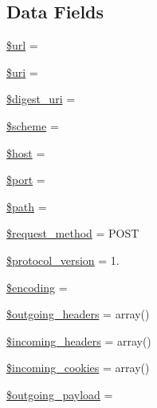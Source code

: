 \subsection*{Data Fields}
\begin{DoxyCompactItemize}
\item 
\hyperlink{classsoap__transport__http_acf215f34a917d014776ce684a9ee8909}{\$url} = \textquotesingle{}\textquotesingle{}
\item 
\hyperlink{classsoap__transport__http_a653b5458163d338546c47271b4fb81b7}{\$uri} = \textquotesingle{}\textquotesingle{}
\item 
\hyperlink{classsoap__transport__http_a7852708352a061a957ebd0fe6f4b0597}{\$digest\+\_\+uri} = \textquotesingle{}\textquotesingle{}
\item 
\hyperlink{classsoap__transport__http_a1665950e3e3b63a02fc5a48706ac81c4}{\$scheme} = \textquotesingle{}\textquotesingle{}
\item 
\hyperlink{classsoap__transport__http_a711797613cb863ca0756df789c396bf2}{\$host} = \textquotesingle{}\textquotesingle{}
\item 
\hyperlink{classsoap__transport__http_aa0787efab4b22e8a212882f3409d4c77}{\$port} = \textquotesingle{}\textquotesingle{}
\item 
\hyperlink{classsoap__transport__http_a0a4baf0b22973c07685c3981f0d17fc4}{\$path} = \textquotesingle{}\textquotesingle{}
\item 
\hyperlink{classsoap__transport__http_afc31291e91d86d30d41495c3774ba977}{\$request\+\_\+method} = \textquotesingle{}P\+O\+S\+T\textquotesingle{}
\item 
\hyperlink{classsoap__transport__http_ab3f5771c62cb5f1fc5035d3b863eb84d}{\$protocol\+\_\+version} = \textquotesingle{}1.\textquotesingle{}
\item 
\hyperlink{classsoap__transport__http_aee271b7ce67fbe00b9976e6c347cbfbf}{\$encoding} = \textquotesingle{}\textquotesingle{}
\item 
\hyperlink{classsoap__transport__http_ac4175695783164be56dd48fda2e405b2}{\$outgoing\+\_\+headers} = array()
\item 
\hyperlink{classsoap__transport__http_afdf0f0ed01b1297a88e948540309701e}{\$incoming\+\_\+headers} = array()
\item 
\hyperlink{classsoap__transport__http_aab5d3e1a6450164cd73bcc8360054a4c}{\$incoming\+\_\+cookies} = array()
\item 
\hyperlink{classsoap__transport__http_a4a8841d1b10972ec8409318070a84bd9}{\$outgoing\+\_\+payload} = \textquotesingle{}\textquotesingle{}

\end{DoxyCompactItemize}
